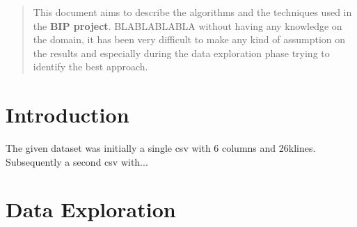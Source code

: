 \documentclass{acm_proc_article-sp}
\begin{document}
\date{30 January 2016}

\maketitle
\begin{abstract}
This document aims to describe the algorithms and the techniques used in the \textbf{BIP project}.
BLABLABLABLA without having any knowledge on the domain, it has been very difficult to make any kind of assumption on the results and especially during the data exploration phase trying to identify the best approach.
\end{abstract}

\section{Introduction}
The given dataset was initially a single csv with 6 columns and 26klines. Subsequently a second csv with...

\section{Data Exploration}
\end{document}
